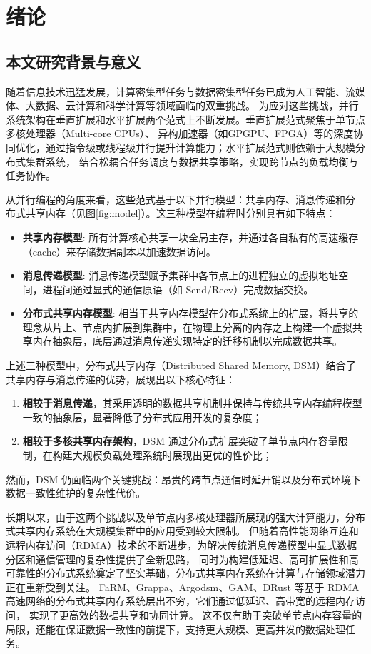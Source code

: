 \chapter{绪论}\label{chap:introduction}{
  \section{本文研究背景与意义}
  随着信息技术迅猛发展，计算密集型任务与数据密集型任务已成为人工智能、流媒体、大数据、云计算和科学计算等领域面临的双重挑战。
  为应对这些挑战，并行系统架构在垂直扩展和水平扩展两个范式上不断发展。垂直扩展范式聚焦于单节点多核处理器（Multi-core CPUs）、
  异构加速器（如GPGPU、FPGA）等的深度协同优化，通过指令级或线程级并行提升计算能力；水平扩展范式则依赖于大规模分布式集群系统，
  结合松耦合任务调度与数据共享策略，实现跨节点的负载均衡与任务协作。

  从并行编程的角度来看，这些范式基于以下并行模型：共享内存、消息传递和分
  布式共享内存（见图\ref{fig:model}）。这三种模型在编程时分别具有如下特点：
  \begin{itemize}
    \item \textbf{共享内存模型}: 所有计算核心共享一块全局主存，并通过各自私有的高速缓存（cache）来存储数据副本以加速数据访问。
    \item \textbf{消息传递模型}: 消息传递模型赋予集群中各节点上的进程独立的虚拟地址空间，进程间通过显式的通信原语（如 Send/Recv）完成数据交换。
    \item \textbf{分布式共享内存模型}: 相当于共享内存模型在分布式系统上的扩展，将共享的理念从片上、节点内扩展到集群中，在物理上分离的内存之上构建一个虚拟共享内存抽象层，底层通过消息传递实现特定的迁移机制以完成数据共享。
  \end{itemize}

  上述三种模型中，分布式共享内存（Distributed Shared Memory, DSM）结合了共享内存与消息传递的优势，展现出以下核心特征：
  \begin{enumerate}[leftmargin=1em, align=left]
    \item \textbf{相较于消息传递}，其采用透明的数据共享机制并保持与传统共享内存编程模型一致的抽象层，显著降低了分布式应用开发的复杂度；
    \item \textbf{相较于多核共享内存架构}，DSM 通过分布式扩展突破了单节点内存容量限制，在构建大规模负载处理系统时展现出更优的性价比；
  \end{enumerate}

  然而，DSM 仍面临两个关键挑战：昂贵的跨节点通信时延开销以及分布式环境下数据一致性维护的复杂性代价。

  长期以来，由于这两个挑战以及单节点内多核处理器所展现的强大计算能力，分布式共享内存系统在大规模集群中的应用受到较大限制。
  但随着高性能网络互连和远程内存访问（RDMA）技术的不断进步，为解决传统消息传递模型中显式数据分区和通信管理的复杂性提供了全新思路，
  同时为构建低延迟、高可扩展性和高可靠性的分布式系统奠定了坚实基础，分布式共享内存系统在计算与存储领域潜力正在重新受到关注。
  FaRM、Grappa、Argodsm、GAM、DRust 等基于 RDMA 高速网络的分布式共享内存系统层出不穷，它们通过低延迟、高带宽的远程内存访问，
  实现了更高效的数据共享和协同计算。
  这不仅有助于突破单节点内存容量的局限，还能在保证数据一致性的前提下，支持更大规模、更高并发的数据处理任务。

}
